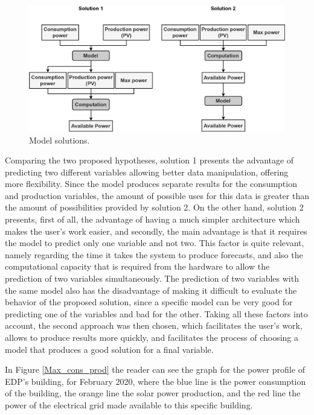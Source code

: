 \begin{figure}[h!]
    \centering
    \begin{center}
    \includegraphics[width=1\textwidth]{Images/Available.png}
    \caption{Model solutions.}
    \label{avsol}
    \end{center}
\end{figure}

Comparing the two proposed hypotheses, solution 1 presents the advantage of predicting two different variables allowing better data manipulation, offering more flexibility. Since the model produces separate results for the consumption and production variables, the amount of possible uses for this data is greater than the amount of possibilities provided by solution 2. On the other hand, solution 2 presents, first of all, the advantage of having a much simpler architecture which makes the user's work easier, and secondly, the main advantage is that it requires the model to predict only one variable and not two. This factor is quite relevant, namely regarding the time it takes the system to produce forecasts, and also the computational capacity that is required from the hardware to allow the prediction of two variables simultaneously. The prediction of two variables with the same model also has the disadvantage of making it difficult to evaluate the behavior of the proposed solution, since a specific model can be very good for predicting one of the variables and bad for the other. 
Taking all these factors into account, the second approach was then chosen, which facilitates the user's work, allows to produce results more quickly, and facilitates the process of choosing a model that produces a good solution for a final variable.


In Figure \ref{Max_cons_prod} the reader can see the graph for the power profile of \ac{EDP}’s building, for February 2020, where the blue line is the power consumption of the building, the orange line the solar power production, and the red line the power of the electrical grid made available to this specific building.


